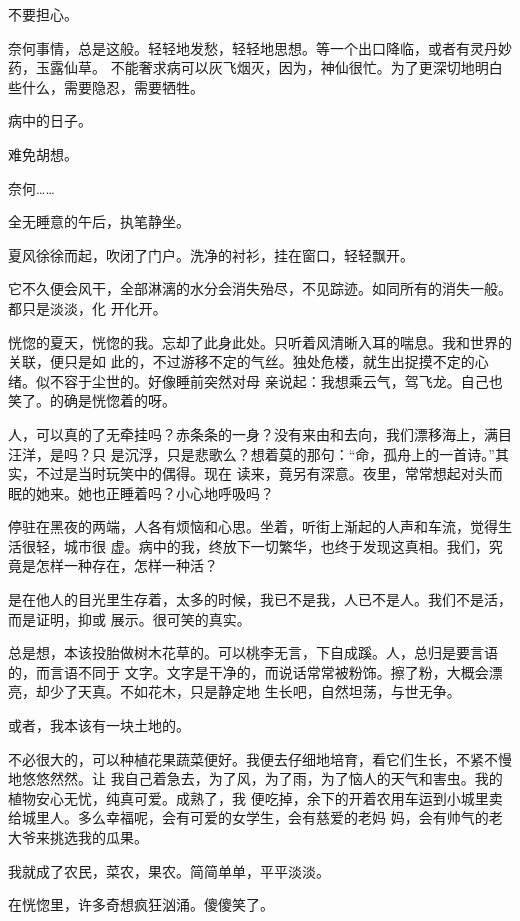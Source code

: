 \documentclass[12pt,a4paper]{article}
\begin{document}
		不要担心。

		奈何事情，总是这般。轻轻地发愁，轻轻地思想。等一个出口降临，或者有灵丹妙药，玉露仙草。
	不能奢求病可以灰飞烟灭，因为，神仙很忙。为了更深切地明白些什么，需要隐忍，需要牺牲。

		病中的日子。

		难免胡想。

		奈何……

	\endwriting



		全无睡意的午后，执笔静坐。

		夏风徐徐而起，吹闭了门户。洗净的衬衫，挂在窗口，轻轻飘开。

		它不久便会风干，全部淋漓的水分会消失殆尽，不见踪迹。如同所有的消失一般。都只是淡淡，化
	开化开。

		恍惚的夏天，恍惚的我。忘却了此身此处。只听着风清晰入耳的喘息。我和世界的关联，便只是如
	此的，不过游移不定的气丝。独处危楼，就生出捉摸不定的心绪。似不容于尘世的。好像睡前突然对母
	亲说起：我想乘云气，驾飞龙。自己也笑了。的确是恍惚着的呀。

		人，可以真的了无牵挂吗？赤条条的一身？没有来由和去向，我们漂移海上，满目汪洋，是吗？只
	是沉浮，只是悲歌么？想着莫的那句：“命，孤舟上的一首诗。”其实，不过是当时玩笑中的偶得。现在
	读来，竟另有深意。夜里，常常想起对头而眠的她来。她也正睡着吗？小心地呼吸吗？

		停驻在黑夜的两端，人各有烦恼和心思。坐着，听街上渐起的人声和车流，觉得生活很轻，城市很
	虚。病中的我，终放下一切繁华，也终于发现这真相。我们，究竟是怎样一种存在，怎样一种活？

		是在他人的目光里生存着，太多的时候，我已不是我，人已不是人。我们不是活，而是证明，抑或
	展示。很可笑的真实。

		总是想，本该投胎做树木花草的。可以桃李无言，下自成蹊。人，总归是要言语的，而言语不同于
	文字。文字是干净的，而说话常常被粉饰。擦了粉，大概会漂亮，却少了天真。不如花木，只是静定地
	生长吧，自然坦荡，与世无争。

		或者，我本该有一块土地的。

		不必很大的，可以种植花果蔬菜便好。我便去仔细地培育，看它们生长，不紧不慢地悠悠然然。让
	我自己着急去，为了风，为了雨，为了恼人的天气和害虫。我的植物安心无忧，纯真可爱。成熟了，我
	便吃掉，余下的开着农用车运到小城里卖给城里人。多么幸福呢，会有可爱的女学生，会有慈爱的老妈
	妈，会有帅气的老大爷来挑选我的瓜果。

		我就成了农民，菜农，果农。简简单单，平平淡淡。

		在恍惚里，许多奇想疯狂汹涌。傻傻笑了。
\end{document}
